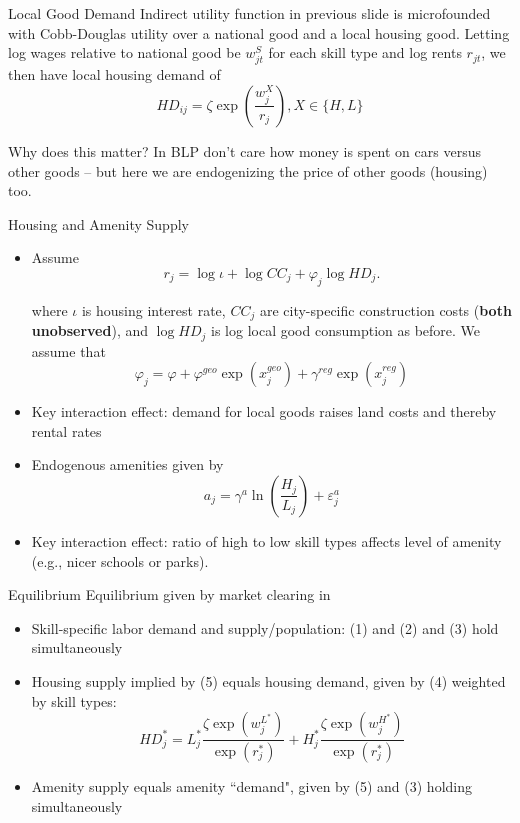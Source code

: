 \documentclass{beamer}
\begin{document}
\begin{frame}{Local Good Demand}
Indirect utility function in previous slide is microfounded with Cobb-Douglas utility over a national good and a local housing good. Letting log wages relative to national good be $w^S_{jt}$ for each skill type and log rents $r_{jt}$, we then have local housing demand of 
\begin{equation}
    HD_{ij} = \zeta \exp \left(\frac{w^X_{j}}{r_{j}}\right), X \in \{H,L\}
\end{equation}

Why does this matter? In BLP don't care how money is spent on cars versus other goods -- but here we are endogenizing the price of other goods (housing) too.
\end{frame}

\begin{frame}{Housing and Amenity Supply}
\begin{itemize}
\item Assume
\begin{equation}\label{eq: housing supply}
    r_{j}  = \log \iota + \log CC_{j} + \varphi_j \log HD_{j}.
\end{equation}

where $\iota$ is housing interest rate, $CC_{j}$ are city-specific construction costs (\textbf{both unobserved}), and $\log HD_{j}$ is log local good consumption as before. We assume that $$\varphi_j  = \varphi +\varphi^{geo} \exp(x_j^{geo}) + \gamma^{reg}\exp(x_j^{reg}) $$
\item Key interaction effect: demand for local goods raises land costs and thereby rental rates
\item Endogenous amenities given by \begin{equation} a_{j}= \gamma^a \ln \left(\frac{H_j}{L_j}\right) + \varepsilon^a_j\end{equation}
\item Key interaction effect: ratio of high to low skill types affects level of amenity (e.g., nicer schools or parks).

\end{itemize}

\end{frame}

\begin{frame}{Equilibrium}
Equilibrium given by 
market clearing in 
\begin{itemize}
\item Skill-specific labor demand and supply/population: (1) and (2) and (3) hold simultaneously 
\item Housing supply implied by (5) equals housing demand, given by (4) weighted by skill types: $$ HD_{j}^* = L_{j}^* \frac{\zeta \exp(w_{j}^{L^*})}{\exp(r_{j}^*)} + H_{j}^* \frac{\zeta \exp(w_{j}^{H^*})}{\exp(r_{j}^*)}$$

\item Amenity supply equals amenity ``demand", given by (5) and (3) holding simultaneously
 
\end{itemize}
\end{frame}
\end{document}
